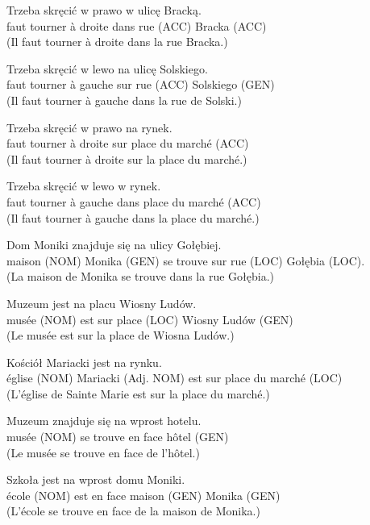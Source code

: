 \documentclass[output=paper]{langscibook}
\begin{document}
\begin{otherlanguage}{french}
\begin{paperappendix}
\begin{exe}
\gll Trzeba   skręcić   w prawo   w   ulicę     Bracką.\\
      faut    tourner  à droite    dans  {rue (ACC)} {Bracka (ACC)}\\
\glt (Il faut tourner à droite dans la rue Bracka.)

\gll Trzeba   skręcić   w lewo     na   ulicę     Solskiego.\\
      faut    tourner  à gauche  sur  {rue (ACC)}   {Solskiego (GEN)}\\
\glt (Il faut tourner à gauche dans la rue de Solski.)

\gll Trzeba   skręcić   w prawo   na   rynek.\\
      faut    tourner  à droite    sur  {place du marché (ACC)}\\
\glt (Il faut tourner à droite sur la place du marché.)

\gll Trzeba   skręcić   w lewo     w   rynek.\\
    faut    tourner  à gauche  dans   {place du marché (ACC)}\\
\glt (Il faut tourner à gauche dans la place du marché.)

\gll Dom     Moniki     {znajduje się}   {na} {ulicy   Gołębiej.}\\
      {maison (NOM)} {Monika (GEN)} {se trouve} {sur} {rue (LOC) Gołębia (LOC).}\\
\glt (La maison de Monika se trouve dans la rue Gołębia.)

\gll Muzeum     jest   na   placu     {Wiosny Ludów.}\\
     {musée (NOM)}   est   sur   {place (LOC)} {Wiosny Ludów (GEN)}\\
\glt (Le musée est sur la place de Wiosna Ludów.)

\gll Kościół     Mariacki       jest   na   rynku.\\
     {église (NOM)} {Mariacki (Adj. NOM)} est  sur  {place du marché (LOC)}\\
\glt (L’église de Sainte Marie est sur la place du marché.)

\gll Muzeum     znajduje się   na wprost   hotelu.\\
     {musée (NOM)} se trouve   en face     {hôtel (GEN)}\\
\glt (Le musée se trouve en face de l’hôtel.)

\gll Szkoła     jest   na wprost   domu     Moniki.\\
     {école (NOM)} est   en face     {maison (GEN)}   {Monika (GEN)}\\
\glt (L’école se trouve en face de la maison de Monika.)


\end{exe}
\end{paperappendix}
\end{otherlanguage}
\end{document}
